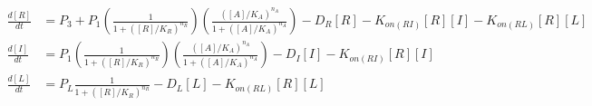 \documentclass{article}
\begin{document}
\Large
\begin{align*}
    \frac{d[R]}{dt} &= P_{3} + P_{1}\left(\frac{1}{1 + ([R]/K_R)^{n_R}}\right)\left(\frac{([A]/K_A)^{n_A}}{1 + ([A]/K_A)^{n_A}}\right) - D_{R}  [R] - K_{on(RI)} [R] [I] - K_{on(RL)}[R][L]  \\
    \frac{d[I]}{dt} &= P_{1}\left(\frac{1}{1 + ([R]/K_R)^{n_R}}\right)\left(\frac{([A]/K_A)^{n_A}}{1 + ([A]/K_A)^{n_A}}\right) - D_{I}  [I] - K_{on(RI)} [R] [I]    \\
    \frac{d[L]}{dt} &= P_{L}\frac{1}{1 + ([R]/K_{R})^{n_{R}}}   - D_{L}  [L] - K_{on(RL)}  [R][L]
\end{align*}
\end{document}

